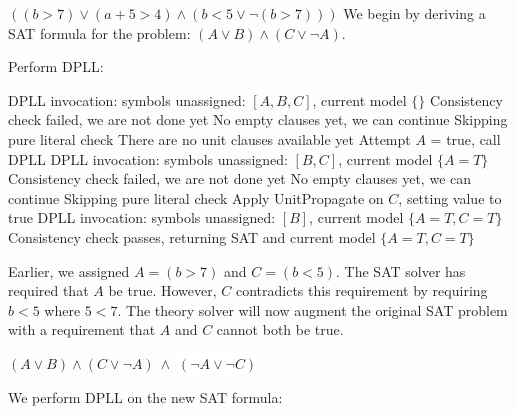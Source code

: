 \documentclass[a4paper,openany,12pt]{book}
\begin{document}
\begin{example}{$((b > 7) \lor (a + 5 > 4) \land (b < 5 \lor \neg (b > 7)))$}
    We begin by deriving a SAT formula for the problem: $(A \lor B) \land (C \lor \neg A)$.

    Perform DPLL:

    \begin{outline}
        \1[\cogs] DPLL invocation: symbols unassigned: $[A, B, C]$, current model $\{\}$
        \1[\arrow] Consistency check failed, we are not done yet
        \1[\arrow] No empty clauses yet, we can continue
        \1[\forward] Skipping pure literal check
        \1[\arrow] There are no unit clauses available yet
        \1[\arrow] Attempt $A$ = true, call DPLL
        \2[\cogs] DPLL invocation: symbols unassigned: $[B, C]$, current model $\{A=T\}$
        \2[\arrow] Consistency check failed, we are not done yet
        \2[\arrow] No empty clauses yet, we can continue
        \2[\forward] Skipping pure literal check
        \2[\arrow] Apply UnitPropagate on $C$, setting value to true
        \3[\cogs] DPLL invocation: symbols unassigned: $[B]$, current model $\{A=T, C=T\}$
        \3[\checkMark] Consistency check passes, returning SAT and current model $\{A=T, C=T\}$
    \end{outline}


    Earlier, we assigned $A = (b > 7)$ and $C = (b < 5)$.
    The SAT solver has required that $A$ be true.
    However, $C$ contradicts this requirement by requiring $b < 5$ where $5 < 7$.
    The theory solver will now augment the original SAT problem with a requirement that $A$ and $C$ cannot both be true.

    \((A \lor B) \land (C \lor \neg A)~\land \) \colorbox{white}{$(\neg A \lor \neg C)$}

    We perform DPLL on the new SAT formula:


\end{example}
\end{document}
